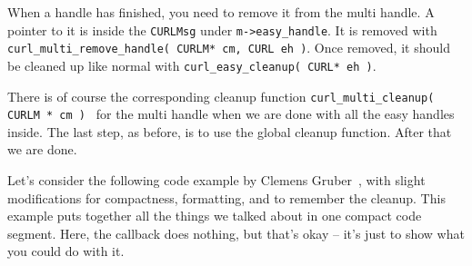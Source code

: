 When a handle has finished, you need to remove it from the multi handle. A pointer to it is inside the \texttt{CURLMsg} under \texttt{m->easy\_handle}. It is removed with \texttt{curl\_multi\_remove\_handle( CURLM* cm, CURL eh )}. Once removed, it should be cleaned up like normal with \texttt{curl\_easy\_cleanup( CURL* eh )}.

There is of course the corresponding cleanup function \texttt{curl\_multi\_cleanup( CURLM * cm ) } for the multi handle when we are done with all the easy handles inside. The last step, as before, is to use the global cleanup function. After that we are done. 

Let's consider the following code example by Clemens Gruber~\cite{curlmulti}, with slight modifications for compactness, formatting, and to remember the cleanup. This example puts together all the things we talked about in one compact code segment. Here, the callback does nothing, but that's okay -- it's just to show what you could do with it.

